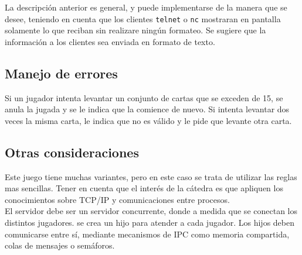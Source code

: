 La descripción anterior es general, y puede implementarse de la manera que se desee, teniendo en cuenta que los clientes \texttt{telnet} o \texttt{nc} mostraran en pantalla solamente lo que reciban sin realizare ningún formateo. Se sugiere que la información a los clientes sea enviada en formato de texto.\\

\subsection{Manejo de errores}

Si un jugador intenta levantar un conjunto de cartas que se exceden de 15, se anula la jugada y se le indica que la comience de nuevo.
Si intenta levantar dos veces la misma carta, le indica que no es válido y le pide que levante otra carta.\\

\subsection{Otras consideraciones}

Este juego tiene muchas variantes, pero en este caso se trata de utilizar las reglas mas sencillas. Tener en cuenta que el interés de la cátedra es que apliquen los conocimientos sobre TCP/IP y comunicaciones entre procesos.\\

El servidor debe ser un servidor concurrente, donde a medida que se conectan los distintos jugadores. se crea un hijo para atender a cada jugador. Los hijos deben comunicarse entre sí, mediante mecanismos de IPC como memoria compartida, colas de mensajes o semáforos.
